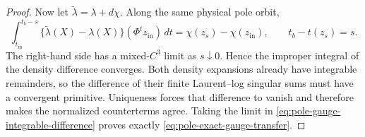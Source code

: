 \documentclass[11pt]{amsart}
\numberwithin{equation}{section}
\theoremstyle{definition}
\theoremstyle{remark}
\begin{document}
\begin{proof}
Now let $\widetilde\lambda=\lambda+d\chi$.  Along the same physical pole
orbit,
\begin{equation}\label{eq:pole-gauge-integrable-difference}
 \int_{t_{\mathrm{in}}}^{t_b-s}
   \bigl\{\widetilde\lambda(X)-\lambda(X)\bigr\}(\Phi^tz_{\mathrm{in}})
   \,dt
 =\chi(z_s)-\chi(z_{\mathrm{in}}),
 \qquad t_b-t(z_s)=s.
\end{equation}
The right-hand side has a mixed-$C^3$ limit as $s\downarrow0$.  Hence the
improper integral of the density difference converges.  Both density
expansions already have integrable remainders, so the difference of their
finite Laurent--log singular sums must have a convergent primitive.
Uniqueness forces that difference to vanish and therefore makes the
normalized counterterms agree.  Taking the limit in
\eqref{eq:pole-gauge-integrable-difference} proves exactly
\eqref{eq:pole-exact-gauge-transfer}.
\end{proof}
\end{document}

